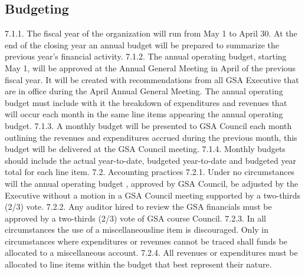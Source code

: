 \subsection{Budgeting }
7.1.1. The fiscal year of the organization will run from May 1 to April 30. At 
the end of the closing year an annual budget will be prepared to 
summarize the previous year’s financial activity. 
7.1.2. The annual operating budget, starting May 1, will be approved at the 
Annual General Meeting in April of the previous fiscal year. It will be 
created with recommendations from all GSA Executive that are in 
office during the April Annual General Meeting. The annual operating 
budget must include with it the breakdown of expenditures and 
revenues that will occur each month in the same line items appearing 
the annual operating budget. 
7.1.3. A monthly budget will be presented to GSA Council each month 
outlining the revenues and expenditures accrued during the previous 
month, this budget will be delivered at the GSA Council meeting. 
7.1.4. Monthly budgets should include the actual year-to-date, budgeted 
year-to-date and budgeted year total for each line item. 
7.2. Accounting practices 
7.2.1. Under no circumstances will the annual operating budget , approved 
by GSA Council, be adjusted by the Executive without a motion in a 
GSA Council meeting supported by a two-thirds (2/3) vote. 
7.2.2. Any auditor hired to review the GSA financials must be approved by a 
two-thirds (2/3) vote of GSA course Council. 
7.2.3. In all circumstances the use of a miscellaneousline item is 
discouraged. Only in circumstances where expenditures or revenues 
cannot be traced shall funds be allocated to a miscellaneous account. 
7.2.4. All revenues or expenditures must be allocated to line items within the 
budget that best represent their nature. 
